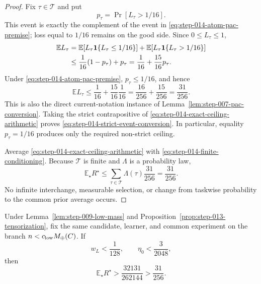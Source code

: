 \begin{proof}
Fix \(\tau\in\mathcal T\) and put
\begin{equation}\label{eq:step-014-bad-probability}
p_\tau=\Pr[L_\tau>1/16].
\end{equation}
This event is exactly the complement of the event in
\eqref{eq:step-014-atom-pac-premise}; loss equal to \(1/16\) remains on
the good side.  Since \(0\le L_\tau\le1\),
\begin{align}
\mathbb E L_\tau
&=\mathbb E[L_\tau\mathbf1\{L_\tau\le1/16\}]
  +\mathbb E[L_\tau\mathbf1\{L_\tau>1/16\}]
\notag\\
&\le\frac1{16}(1-p_\tau)+p_\tau
=\frac1{16}+\frac{15}{16}p_\tau.
\label{eq:step-014-bounded-loss-envelope}
\end{align}
Under \eqref{eq:step-014-atom-pac-premise},
\(p_\tau\le1/16\), and hence
\begin{equation}\label{eq:step-014-exact-ceiling-arithmetic}
\mathbb E L_\tau
\le\frac1{16}+\frac{15}{16}\frac1{16}
=\frac{16}{256}+\frac{15}{256}
=\frac{31}{256}.
\end{equation}
This is also the direct current-notation instance of
Lemma~\ref{lem:step-007-pac-conversion}.  Taking the strict
contrapositive of \eqref{eq:step-014-exact-ceiling-arithmetic} proves
\eqref{eq:step-014-strict-event-conversion}.  In particular, equality
\(p_\tau=1/16\) produces only the required non-strict ceiling.

Average \eqref{eq:step-014-exact-ceiling-arithmetic} with
\eqref{eq:step-014-finite-conditioning}.  Because \(\mathcal T\) is
finite and \(\Lambda\) is a probability law,
\begin{equation}\label{eq:step-014-prior-ceiling}
\mathbb E_\star R^\star
\le\sum_{\tau\in\mathcal T}
\Lambda(\tau)\frac{31}{256}
=\frac{31}{256}.
\end{equation}
No infinite interchange, measurable selection, or change from
taskwise probability to the common prior average occurs.
\end{proof}

\begin{lemma}
\label{lem:step-014-rational-gap}
Under Lemma~\ref{lem:step-009-low-mass} and
Proposition~\ref{prop:step-013-tensorization}, fix the same candidate,
learner, and common experiment on the branch
\(n<c_{\rm low}M_{\oplus}(C)\).  If
\begin{equation}\label{eq:step-014-defect-bounds}
w_L<\frac1{128},
\qquad
\eta_0<\frac3{2048},
\end{equation}
then
\begin{equation}\label{eq:step-014-rational-gap}
\mathbb E_\star R^\star
>\frac{32131}{262144}
>\frac{31}{256}.
\end{equation}
\end{lemma}

